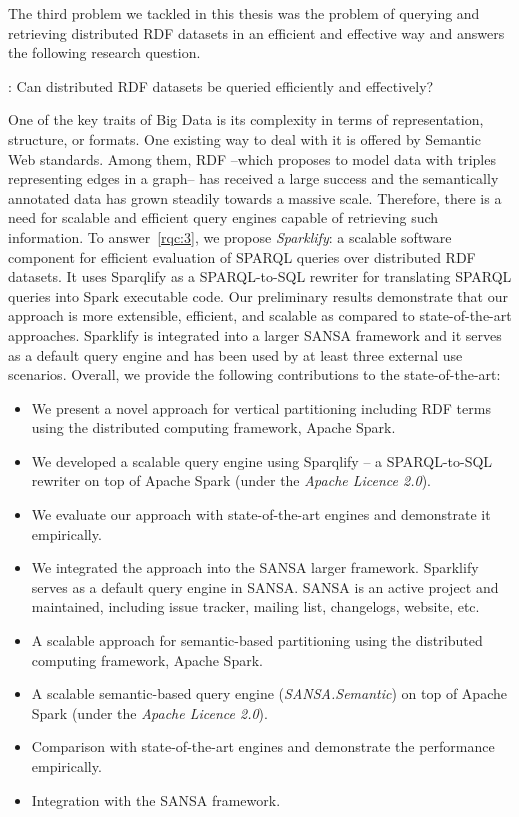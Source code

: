 The third problem we tackled in this thesis was the problem of querying and retrieving distributed RDF datasets in an efficient and effective way and answers the following research question.

\begin{tcolorbox}
\textbf{\rqNr[RQ3]\label{rqc:3}}: Can distributed RDF datasets be queried efficiently and effectively?
\end{tcolorbox}

One of the key traits of Big Data is its complexity in terms of representation, structure, or formats.
One existing way to deal with it is offered by Semantic Web standards.
Among them, RDF --which proposes to model data with triples representing edges in a graph-- has received a large success and the semantically annotated data has grown steadily towards a massive scale.
Therefore, there is a need for scalable and efficient query engines capable of retrieving such information.
To answer~\ref{rqc:3}, we propose \emph{Sparklify}: a scalable software component for efficient evaluation of SPARQL queries over distributed RDF datasets. 
It uses Sparqlify as a SPARQL-to-SQL rewriter for translating SPARQL queries into Spark executable code.
Our preliminary results demonstrate that our approach is more extensible, efficient, and scalable as compared to state-of-the-art approaches.
Sparklify is integrated into a larger SANSA framework and it serves as a default query engine and has been used by at least three external use scenarios.
Overall, we provide the following contributions to the state-of-the-art:
\begin{itemize}
 \item We present a novel approach for vertical partitioning including RDF terms using the distributed computing framework, Apache Spark.
 \item We developed a scalable query engine using Sparqlify -- a SPARQL-to-SQL rewriter on top of Apache Spark (under the \textit{Apache Licence 2.0}).
 \item We evaluate our approach with state-of-the-art engines and demonstrate it empirically.
 \item We integrated the approach into the SANSA larger framework.
 Sparklify serves as a default query engine in SANSA.
 SANSA is an active project and maintained, including issue tracker, mailing list, changelogs, website, etc.
 \item A scalable approach for semantic-based partitioning using the distributed computing framework, Apache Spark.
 \item A scalable semantic-based query engine (\textit{SANSA.Semantic}) on top of Apache Spark (under the \textit{Apache Licence 2.0}).
 \item Comparison with state-of-the-art engines and demonstrate the performance empirically.
 \item Integration with the SANSA framework.
\end{itemize}


